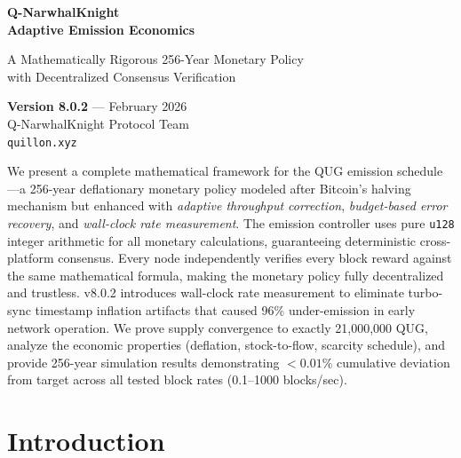 \documentclass[11pt,a4paper]{article}
\begin{document}
\begin{titlepage}
\centering
\vspace*{2cm}

{\Huge\bfseries\color{qugblue} Q-NarwhalKnight\\[0.3cm]
\color{black} Adaptive Emission Economics}

\vspace{1cm}

{\Large A Mathematically Rigorous 256-Year Monetary Policy\\
with Decentralized Consensus Verification}

\vspace{2cm}

{\large
\textbf{Version 8.0.2} --- February 2026\\[0.5cm]
Q-NarwhalKnight Protocol Team\\
\texttt{quillon.xyz}
}

\vspace{2cm}

\begin{tcolorbox}[colback=blue!5,colframe=qugblue,title=\textbf{Abstract}]
We present a complete mathematical framework for the QUG emission schedule---a 256-year deflationary monetary policy modeled after Bitcoin's halving mechanism but enhanced with \emph{adaptive throughput correction}, \emph{budget-based error recovery}, and \emph{wall-clock rate measurement}. The emission controller uses pure \texttt{u128} integer arithmetic for all monetary calculations, guaranteeing deterministic cross-platform consensus. Every node independently verifies every block reward against the same mathematical formula, making the monetary policy fully decentralized and trustless. v8.0.2 introduces wall-clock rate measurement to eliminate turbo-sync timestamp inflation artifacts that caused 96\% under-emission in early network operation. We prove supply convergence to exactly 21,000,000 QUG, analyze the economic properties (deflation, stock-to-flow, scarcity schedule), and provide 256-year simulation results demonstrating $<0.01\%$ cumulative deviation from target across all tested block rates (0.1--1000 blocks/sec).
\end{tcolorbox}

\vfill
\end{titlepage}

\tableofcontents
\newpage

\section{Introduction}
\end{document}
